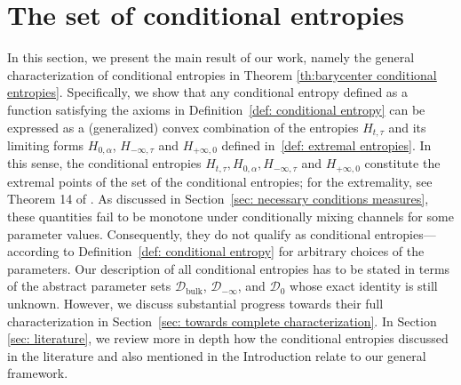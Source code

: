 \documentclass[aps,pra,11pt,onecolumn,nofootinbib,tightenlines]{revtex4-2}
\theoremstyle{definition}
\begin{document}
 \section{The set of conditional entropies}
\label{sec: set of conditional entropies}
In this section, we present the main result of our work, namely the general characterization of conditional entropies in Theorem \ref{th:barycenter conditional entropies}. Specifically, we show that any conditional entropy defined as a function satisfying the axioms in Definition~\ref{def: conditional entropy} can be expressed as a (generalized) convex combination of the entropies $H_{t,\tau}$ and its limiting forms $H_{0,\alpha}$, $H_{-\infty,\tau}$ and $H_{+\infty,0}$ defined in~\ref{def: extremal entropies}. In this sense, the conditional entropies $H_{t,\tau},H_{0,\alpha},H_{-\infty,\tau}$ and $H_{+\infty,0}$ constitute the extremal points of the set of the conditional entropies; for the extremality, see Theorem 14 of \cite{haapasalo_inprep}. As discussed in Section~\ref{sec: necessary conditions measures}, these quantities fail to be monotone under conditionally mixing channels for some parameter values. Consequently, they do not qualify as conditional entropies—according to Definition~\ref{def: conditional entropy} for arbitrary choices of the parameters. Our description of all conditional entropies has to be stated in terms of the abstract parameter sets $\mathcal{D}_{\mathrm{bulk}}$, $\mathcal{D}_{-\infty}$, and $\mathcal{D}_{0}$ whose exact identity is still unknown. However, we discuss substantial progress towards their full characterization in Section~\ref{sec: towards complete characterization}. In Section \ref{sec: literature}, we review more in depth how the conditional entropies discussed in the literature and also mentioned in the Introduction relate to our general framework.


\end{document}
